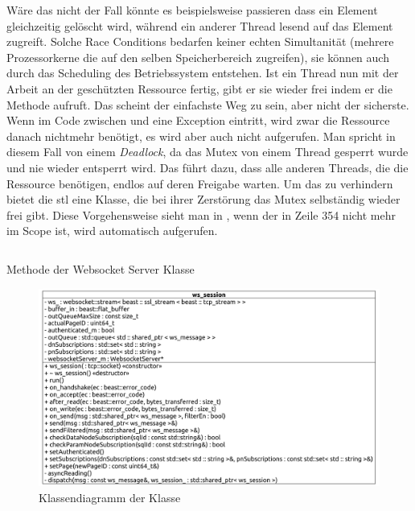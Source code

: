 Wäre das nicht der Fall könnte es beispielsweise passieren dass ein Element gleichzeitig gelöscht wird, während ein anderer Thread lesend auf das Element zugreift.
Solche Race Conditions bedarfen keiner echten Simultanität (mehrere Prozessorkerne die auf den selben Speicherbereich zugreifen), sie können auch durch das Scheduling des Betriebssystem entstehen. 
Ist ein Thread nun mit der Arbeit an der geschützten Ressource fertig, gibt er sie wieder frei indem er die Methode  aufruft.
Das scheint der einfachste Weg zu sein, aber nicht der sicherste. 
Wenn im Code zwischen  und  eine Exception eintritt, 
wird zwar die Ressource danach nichtmehr benötigt, es wird aber auch nicht  aufgerufen.
Man spricht in diesem Fall von einem \emph{Deadlock}, da das Mutex von einem Thread gesperrt wurde und nie wieder entsperrt wird. 
Das führt dazu, dass alle anderen Threads, die die Ressource benötigen, endlos auf deren Freigabe warten. 
Um das zu verhindern bietet die \ac{stl} eine  Klasse, die bei ihrer Zerstörung das Mutex selbständig wieder frei gibt.
Diese Vorgehensweise sieht man in , wenn der  in Zeile 354 nicht mehr im Scope ist, wird automatisch  aufgerufen.
\begin{listing}[ht]
  \inputminted[linenos=true,breaklines=true, firstline=348, lastline=354]{c++}{../Backend/WebsocketServer.cpp}
  \caption{Methode  der Websocket Server Klasse}
  \label{list:addSession}
\end{listing}
\begin{figure}[ht]
  \centering
  \includegraphics[width=\textwidth]{content/hauptteil/umsetzungPoC/backend/uml/classesOfOverview/ws_session.pdf}
  \caption{Klassendiagramm der Klasse }
  \label{fig:backend:classDiag:wsSession}
\end{figure}
